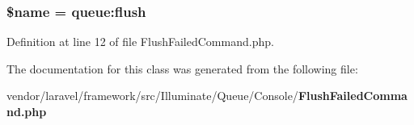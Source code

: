 \subsubsection[{\$name}]{\setlength{\rightskip}{0pt plus 5cm}\${\bf name} = \textquotesingle{}queue\+:flush\textquotesingle{}\hspace{0.3cm}{\ttfamily [protected]}}\label{class_illuminate_1_1_queue_1_1_console_1_1_flush_failed_command_ab2fc40d43824ea3e1ce5d86dee0d763b}


Definition at line 12 of file Flush\+Failed\+Command.\+php.



The documentation for this class was generated from the following file\+:\begin{DoxyCompactItemize}
\item 
vendor/laravel/framework/src/\+Illuminate/\+Queue/\+Console/{\bf Flush\+Failed\+Command.\+php}\end{DoxyCompactItemize}
